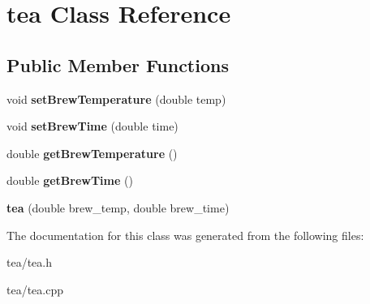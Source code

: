 \hypertarget{classtea}{}\section{tea Class Reference}
\label{classtea}
\subsection*{Public Member Functions}
\begin{DoxyCompactItemize}
\item 
\mbox{\label{classtea_a6853c9899596abea3121aae76b12e5f6}} 
void {\bfseries set\+Brew\+Temperature} (double temp)
\item 
\mbox{\label{classtea_aa541720b90b31274c3bba3e77d765c81}} 
void {\bfseries set\+Brew\+Time} (double time)
\item 
\mbox{\label{classtea_a8a83c91eb834c18d646e048e82a8528b}} 
double {\bfseries get\+Brew\+Temperature} ()
\item 
\mbox{\label{classtea_a550ccb4846b555ed1717e7e8373d8a25}} 
double {\bfseries get\+Brew\+Time} ()
\item 
\mbox{\label{classtea_ae5f444d5215b49aae039b46a47ad908f}} 
{\bfseries tea} (double brew\+\_\+temp, double brew\+\_\+time)
\end{DoxyCompactItemize}


The documentation for this class was generated from the following files\+:\begin{DoxyCompactItemize}
\item 
tea/tea.\+h\item 
tea/tea.\+cpp\end{DoxyCompactItemize}
